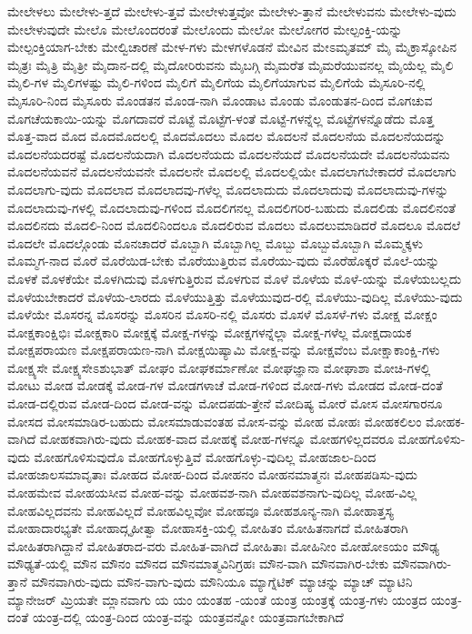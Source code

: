 {ಮೇಲೇಳಲು
ಮೇಲೇಳು-ತ್ತದೆ
ಮೇಲೇಳು-ತ್ತವೆ
ಮೇಲೇಳುತ್ತವೋ
ಮೇಲೇಳು-ತ್ತಾನೆ
ಮೇಲೇಳುವನು
ಮೇಲೇಳು-ವುದು
ಮೇಲೇಳುವುದೇ
ಮೇಲೊ
ಮೇಲೊಂದರಂತೆ
ಮೇಲೊಂದು
ಮೇಲೋ
ಮೇಲೋಗರ
ಮೇಲ್ಪಂಕ್ತಿ-ಯನ್ನು
ಮೇಲ್ಪಂಕ್ತಿಯಾಗ-ಬೇಕು
ಮೇಲ್ವಿಚಾರಣೆ
ಮೇಳ-ಗಳು
ಮೇಳಗಳೊಡನೆ
ಮೇವಿನ
ಮೇಽಮೃತಮ್
ಮೈ
ಮೈಕ್ರಾಸ್ಕೋಪಿನ
ಮೈತ್ರಃ
ಮೈತ್ರಿ
ಮೈತ್ರೀ
ಮೈದಾನ-ದಲ್ಲಿ
ಮೈದೋರಿರುವನು
ಮೈಬಗ್ಗಿ
ಮೈಮರೆತ
ಮೈಮರೆಯುವನಲ್ಲ
ಮೈಯೆಲ್ಲ
ಮೈಲಿ
ಮೈಲಿ-ಗಳ
ಮೈಲಿಗಳಷ್ಟು
ಮೈಲಿ-ಗಳಿಂದ
ಮೈಲಿಗೆ
ಮೈಲಿಗೆಯ
ಮೈಲಿಗೆಯಾಗುವ
ಮೈಲಿಗೆಯೆ
ಮೈಸೂರಿ-ನಲ್ಲಿ
ಮೈಸೂರಿ-ನಿಂದ
ಮೈಸೂರು
ಮೊಂಡತನ
ಮೊಂಡ-ನಾಗಿ
ಮೊಂಡಾಟ
ಮೊಂಡು
ಮೊಂಡುತನ-ದಿಂದ
ಮೊಗಚುವ
ಮೊಗಚೆಯಕಾಯಿ-ಯನ್ನು
ಮೊಗದಾವರೆ
ಮೊಟ್ಟೆ
ಮೊಟ್ಟೆಗ-ಳಂತೆ
ಮೊಟ್ಟೆ-ಗಳನ್ನೆಲ್ಲ
ಮೊಟ್ಟೆಗಳನ್ನೊಡೆದು
ಮೊತ್ತ
ಮೊತ್ತ-ವಾದ
ಮೊದ
ಮೊದಮೊದಲಲ್ಲಿ
ಮೊದಮೊದಲು
ಮೊದಲ
ಮೊದಲನೆ
ಮೊದಲನೆಯ
ಮೊದಲನೆಯದನ್ನು
ಮೊದಲನೆಯದರಷ್ಟೆ
ಮೊದಲನೆಯದಾಗಿ
ಮೊದಲನೆಯದು
ಮೊದಲನೆಯದೆ
ಮೊದಲನೆಯದೇ
ಮೊದಲನೆಯವನು
ಮೊದಲನೆಯವನೆ
ಮೊದಲನೆಯವನೇ
ಮೊದಲನೇ
ಮೊದಲಲ್ಲಿ
ಮೊದಲಲ್ಲಿಯೇ
ಮೊದಲಾಗಬೇಕಾದರೆ
ಮೊದಲಾಗು
ಮೊದಲಾಗು-ವುದು
ಮೊದಲಾದ
ಮೊದಲಾದವು-ಗಳೆಲ್ಲ
ಮೊದಲಾದುದು
ಮೊದಲಾದುವು
ಮೊದಲಾದುವು-ಗಳನ್ನು
ಮೊದಲಾದುವು-ಗಳಲ್ಲಿ
ಮೊದಲಾದುವು-ಗಳಿಂದ
ಮೊದಲಿಗನಲ್ಲ
ಮೊದಲಿಗರಿರ-ಬಹುದು
ಮೊದಲಿಡು
ಮೊದಲಿನಂತೆ
ಮೊದಲಿನದು
ಮೊದಲಿ-ನಿಂದ
ಮೊದಲಿನಿಂದಲೂ
ಮೊದಲಿರುವ
ಮೊದಲು
ಮೊದಲುಮಾಡಿದರೆ
ಮೊದಲೂ
ಮೊದಲೆ
ಮೊದಲೇ
ಮೊದಲ್ಗೊಂಡು
ಮೊನಚಾದರೆ
ಮೊಬ್ಬಾಗಿ
ಮೊಬ್ಬಾಗಿಲ್ಲ
ಮೊಬ್ಬು
ಮೊಬ್ಬುಮೊಬ್ಬಾಗಿ
ಮೊಮ್ಮಕ್ಕಳು
ಮೊಮ್ಮಗ-ನಾದ
ಮೊರೆ
ಮೊರೆಯಿಡ-ಬೇಕು
ಮೊರೆಯುತ್ತಿರುವ
ಮೊರೆಯು-ವುದು
ಮೊರೆಹೊಕ್ಕರೆ
ಮೊಲೆ-ಯನ್ನು
ಮೊಳಕೆ
ಮೊಳಕೆಯೇ
ಮೊಳಗಿದುವು
ಮೊಳಗುತ್ತಿರುವ
ಮೊಳಗುವ
ಮೊಳೆ
ಮೊಳೆಯ
ಮೊಳೆ-ಯನ್ನು
ಮೊಳೆಯಬಲ್ಲದು
ಮೊಳೆಯಬೇಕಾದರೆ
ಮೊಳೆಯ-ಲಾರದು
ಮೊಳೆಯುತ್ತಿತ್ತು
ಮೊಳೆಯುವುದ-ರಲ್ಲಿ
ಮೊಳೆಯು-ವುದಿಲ್ಲ
ಮೊಳೆಯು-ವುದು
ಮೊಳೆಯೇ
ಮೊಸರನ್ನ
ಮೊಸರನ್ನು
ಮೊಸರಿನ
ಮೊಸರಿ-ನಲ್ಲಿ
ಮೊಸರು
ಮೊಸಳೆ
ಮೊಸಳೆ-ಗಳು
ಮೋಕ್ಷ
ಮೋಕ್ಷಂ
ಮೋಕ್ಷಕಾಂಕ್ಷಿಭಿಃ
ಮೋಕ್ಷಕಾರಿ
ಮೋಕ್ಷಕ್ಕೆ
ಮೋಕ್ಷ-ಗಳನ್ನು
ಮೋಕ್ಷಗಳನ್ನೆಲ್ಲಾ
ಮೋಕ್ಷ-ಗಳೆಲ್ಲ
ಮೋಕ್ಷದಾಯಕ
ಮೋಕ್ಷಪರಾಯಣ
ಮೋಕ್ಷಪರಾಯಣ-ನಾಗಿ
ಮೋಕ್ಷಯಿಷ್ಯಾಮಿ
ಮೋಕ್ಷ-ವನ್ನು
ಮೋಕ್ಷವೆಂಬ
ಮೋಕ್ಷಾಕಾಂಕ್ಷಿ-ಗಳು
ಮೋಕ್ಷ್ಯಸೇ
ಮೋಕ್ಷ್ಯಸೇಽಶುಭಾತ್
ಮೋಘಂ
ಮೋಘಕರ್ಮಾಣೋ
ಮೋಘಜ್ಞಾನಾ
ಮೋಘಾಶಾ
ಮೋಚಿ-ಗಳಲ್ಲಿ
ಮೋಟು
ಮೋಡ
ಮೋಡಕ್ಕೆ
ಮೋಡ-ಗಳ
ಮೋಡಗಳಾಚೆ
ಮೋಡ-ಗಳಿಂದ
ಮೋಡ-ಗಳು
ಮೋಡದ
ಮೋಡ-ದಂತೆ
ಮೋಡ-ದಲ್ಲಿರುವ
ಮೋಡ-ದಿಂದ
ಮೋಡ-ವನ್ನು
ಮೋದಪಡು-ತ್ತೇನೆ
ಮೋದಿಷ್ಯ
ಮೋರೆ
ಮೋಸ
ಮೋಸಗಾರನೂ
ಮೋಸದ
ಮೋಸಮಾಡಿರ-ಬಹುದು
ಮೋಸಮಾಡುವಂತಹ
ಮೋಸ-ವನ್ನು
ಮೋಹ
ಮೋಹಃ
ಮೋಹಕಲಿಲಂ
ಮೋಹಕ-ವಾಗಿದೆ
ಮೋಹಕವಾಗಿರು-ವುದು
ಮೋಹಕ-ವಾದ
ಮೋಹಕ್ಕೆ
ಮೋಹ-ಗಳನ್ನೂ
ಮೋಹಗಳಿಲ್ಲದವರೂ
ಮೋಹಗೊಳಿಸು-ವುದು
ಮೋಹಗೊಳಿಸುವುದೊ
ಮೋಹಗೊಳ್ಳುತ್ತಿವೆ
ಮೋಹಗೊಳ್ಳು-ವುದಿಲ್ಲ
ಮೋಹಜಾಲ-ದಿಂದ
ಮೋಹಜಾಲಸಮಾವೃತಾಃ
ಮೋಹದ
ಮೋಹ-ದಿಂದ
ಮೋಹನಂ
ಮೋಹನಮಾತ್ಮನಃ
ಮೋಹಪಡಿಸು-ವುದು
ಮೋಹಮೇವ
ಮೋಹಯಸೀವ
ಮೋಹ-ವನ್ನು
ಮೋಹವಶ-ನಾಗಿ
ಮೋಹವಶನಾಗು-ವುದಿಲ್ಲ
ಮೋಹ-ವಿಲ್ಲ
ಮೋಹವಿಲ್ಲದವನು
ಮೋಹವಿಲ್ಲದೆ
ಮೋಹವಿಲ್ಲವೋ
ಮೋಹವೂ
ಮೋಹಶೂನ್ಯ-ನಾಗಿ
ಮೋಹಾತ್ತಸ್ಯ
ಮೋಹಾದಾರಭ್ಯತೇ
ಮೋಹಾದ್ಗೃಹೀತ್ವಾ
ಮೋಹಾಸಕ್ತಿ-ಯಲ್ಲಿ
ಮೋಹಿತಂ
ಮೋಹಿತನಾಗದೆ
ಮೋಹಿತರಾಗಿ
ಮೋಹಿತರಾಗಿದ್ದಾನೆ
ಮೋಹಿತರಾದ-ವರು
ಮೋಹಿತ-ವಾಗಿದೆ
ಮೋಹಿತಾಃ
ಮೋಹಿನೀಂ
ಮೋಹೋಽಯಂ
ಮೌಢ್ಯ
ಮೌಢ್ಯತೆ-ಯಲ್ಲಿ
ಮೌನ
ಮೌನಂ
ಮೌನದ
ಮೌನಮಾತ್ಮವಿನಿಗ್ರಹಃ
ಮೌನ-ವಾಗಿ
ಮೌನವಾಗಿರ-ಬೇಕು
ಮೌನವಾಗಿರು-ತ್ತಾನೆ
ಮೌನವಾಗಿರು-ವುದು
ಮೌನ-ವಾಗು-ವುದು
ಮೌನಿಯೂ
ಮ್ಯಾಗ್ನೆಟಿಕ್
ಮ್ಯಾಚನ್ನು
ಮ್ಯಾಚ್
ಮ್ಯಾಟಿನಿ
ಮ್ಯಾನೇಜರ್
ಮ್ರಿಯತೇ
ಮ್ಲಾನವಾಗು
ಯ
ಯಂ
ಯಂತಹ
-ಯಂತೆ
ಯಂತ್ರ
ಯಂತ್ರಕ್ಕೆ
ಯಂತ್ರ-ಗಳು
ಯಂತ್ರದ
ಯಂತ್ರ-ದಂತೆ
ಯಂತ್ರ-ದಲ್ಲಿ
ಯಂತ್ರ-ದಿಂದ
ಯಂತ್ರ-ವನ್ನು
ಯಂತ್ರವನ್ನೋ
ಯಂತ್ರವಾಗಬೇಕಾಗಿದೆ
}

